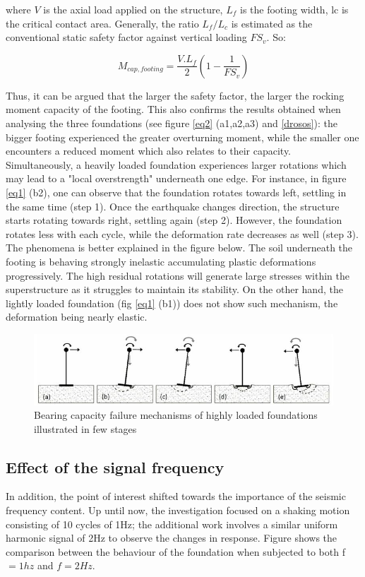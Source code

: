  where $V$ is the axial load applied on the structure, $L_f$ is the footing width, \gls{lc} is the critical contact area. Generally, the ratio $L_f/L_c$ is estimated as the conventional static safety factor against vertical loading $FS_v$. So:
 
 \begin{equation}
 M_{cap,footing} = \frac{V.L_f}{2}(1-\frac{1}{FS_v})
 \end{equation} 	
 
 Thus, it can be argued that the larger the safety factor, the larger the rocking moment capacity of the footing. This also confirms the results obtained when analysing the three foundations (see figure \ref{eq2} (a1,a2,a3) and \ref{drosos}): the bigger footing experienced the greater overturning moment, while the smaller one encounters a reduced moment which also relates to their capacity. Simultaneously, a heavily loaded foundation experiences larger rotations which may lead to a "local overstrength" underneath one edge. For instance, in figure \ref{eq1} (b2), one can observe that the foundation rotates towards left, settling in the same time (step 1). Once the earthquake changes direction, the structure starts rotating towards right, settling again (step 2). However, the foundation rotates less with each cycle, while the deformation rate decreases as well (step 3). The phenomena is better explained in the figure below. The soil underneath the footing is behaving strongly inelastic accumulating plastic deformations progressively. The high residual rotations will generate large stresses within the superstructure as it struggles to maintain its stability. On the other hand, the lightly loaded foundation (fig \ref{eq1} (b1)) does not show such mechanism, the deformation being nearly elastic. 
 
  \begin{figure}[!h]
  	\centering
  	\includegraphics[width=0.7 \linewidth]{"bearing"}
  	\caption{Bearing capacity failure mechanisms of highly loaded foundations illustrated in few stages}
  	\label{bearingc}
  \end{figure}
 
 \pagebreak
 
 \newpage
 \subsection{Effect of the signal frequency}
 In addition, the point of interest shifted towards the importance of the seismic frequency content. Up until now, the investigation focused on a shaking motion consisting of 10 cycles of 1Hz; the additional work involves a similar uniform harmonic signal of 2Hz to observe the changes in response. Figure shows the comparison between the behaviour of the foundation when subjected to both \gls{f}$=1hz$ and $f=2Hz$.
 
